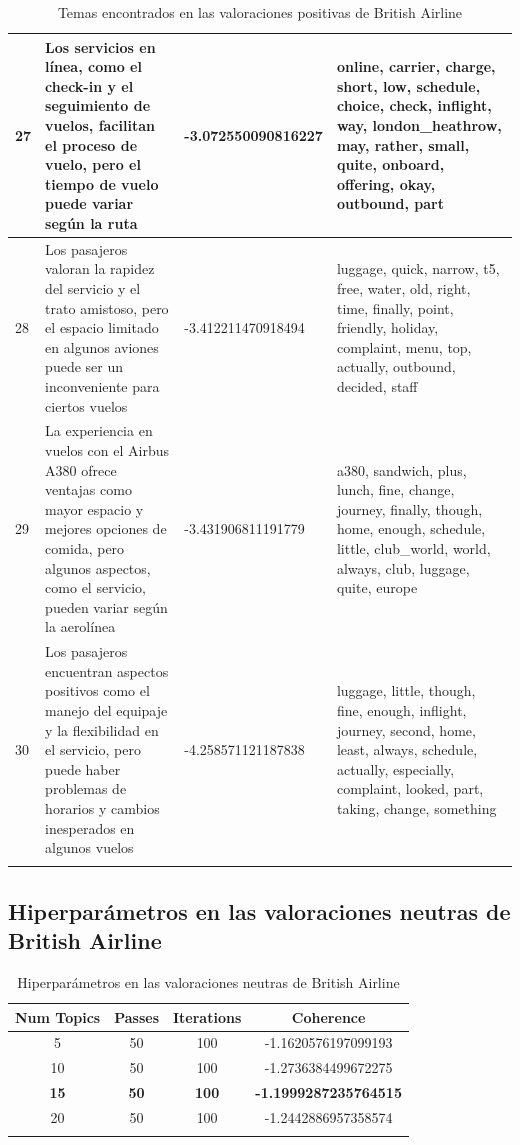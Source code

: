 \documentclass{report}
\begin{document}
\begin{longtable}{|p{1cm}|p{4cm}|p{4cm}|p{6cm}|}
                    27 & Los servicios en línea, como el check-in y el seguimiento de vuelos, facilitan el proceso de vuelo, pero el tiempo de vuelo puede variar según la ruta & -3.072550090816227 & online, carrier, charge, short, low, schedule, choice, check, inflight, way, london\_heathrow, may, rather, small, quite, onboard, offering, okay, outbound, part \\
                    \hline
                    28 & Los pasajeros valoran la rapidez del servicio y el trato amistoso, pero el espacio limitado en algunos aviones puede ser un inconveniente para ciertos vuelos & -3.412211470918494 & luggage, quick, narrow, t5, free, water, old, right, time, finally, point, friendly, holiday, complaint, menu, top, actually, outbound, decided, staff \\
                    \hline
                    29 & La experiencia en vuelos con el Airbus A380 ofrece ventajas como mayor espacio y mejores opciones de comida, pero algunos aspectos, como el servicio, pueden variar según la aerolínea & -3.431906811191779 & a380, sandwich, plus, lunch, fine, change, journey, finally, though, home, enough, schedule, little, club\_world, world, always, club, luggage, quite, europe \\
                    \hline
                    30 & Los pasajeros encuentran aspectos positivos como el manejo del equipaje y la flexibilidad en el servicio, pero puede haber problemas de horarios y cambios inesperados en algunos vuelos & -4.258571121187838 & luggage, little, though, fine, enough, inflight, journey, second, home, least, always, schedule, actually, especially, complaint, looked, part, taking, change, something \\
                    \hline
                    \caption{Temas encontrados en las valoraciones positivas de British Airline}
                \end{longtable}
            \clearpage\subsection{Hiperparámetros en las valoraciones neutras de British Airline}
                \label{tab:hiperparametros_british_airline_neutras}
                \begin{longtable}{|c|c|c|c|}
                    \hline
                    \textbf{Num Topics} & \textbf{Passes} & \textbf{Iterations} & \textbf{Coherence} \\
                    \hline
                    5 & 50 & 100 & -1.1620576197099193 \\
                    \hline
                    10 & 50 & 100 & -1.2736384499672275 \\
                    \hline
                    \textbf{15} & \textbf{50} & \textbf{100} & \textbf{-1.1999287235764515} \\
                    \hline
                    20 & 50 & 100 & -1.2442886957358574 \\
                    \hline
                    \caption{Hiperparámetros en las valoraciones neutras de British Airline}
                \end{longtable}
\end{document}
